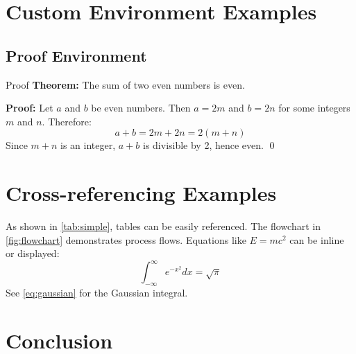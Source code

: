 \documentclass[a4paper,12pt]{article}
\begin{document}
\section{Custom Environment Examples}

\subsection{Proof Environment}
\begin{breakablebox}{Proof}
\textbf{Theorem:} The sum of two even numbers is even.

\textbf{Proof:} Let $a$ and $b$ be even numbers. Then $a = 2m$ and $b = 2n$ 
for some integers $m$ and $n$. Therefore:
\[ a + b = 2m + 2n = 2(m + n) \]
Since $m + n$ is an integer, $a + b$ is divisible by 2, hence even. \qed
\end{breakablebox}

\section{Cross-referencing Examples}

As shown in \cref{tab:simple}, tables can be easily referenced. 
The flowchart in \cref{fig:flowchart} demonstrates process flows.
Equations like $E = mc^2$ can be inline or displayed:
\begin{equation}
    \int_{-\infty}^{\infty} e^{-x^2} dx = \sqrt{\pi}
    \label{eq:gaussian}
\end{equation}
See \cref{eq:gaussian} for the Gaussian integral.

\section{Conclusion}
\end{document}
